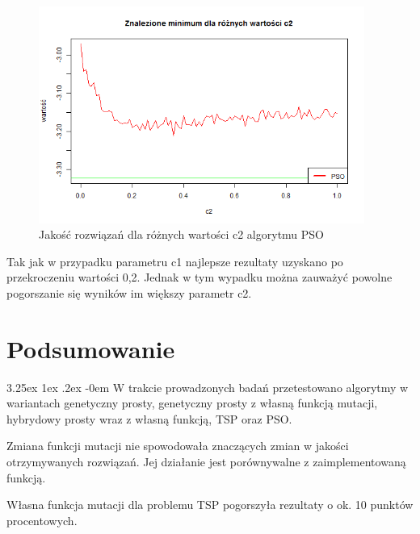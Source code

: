 \documentclass[11pt, a4paper]{article}
\makeatletter
\newcommand{\fbi}{\leavevmode{\parindent=1em\indent}}
\renewcommand\paragraph{\@startsection{paragraph}{5}{\z@}
  {3.25ex \@plus1ex \@minus.2ex}
  {-0em}
  {\normalfont\normalsize\bfseries}}
\makeatother
\begin{document}
\begin{figure}[H]
	\centering
	\includegraphics[width=0.95\textwidth]{./assets/Hartman6c2.png}
	\caption{Jakość rozwiązań dla różnych wartości c2 algorytmu PSO}
	\label{fig:psoc2}
\end{figure}

\fbi
Tak jak w przypadku parametru c1 najlepsze rezultaty uzyskano po przekroczeniu wartości 0,2. Jednak w tym wypadku można zauważyć powolne pogorszanie się wyników im większy parametr c2. 

\newpage
\section{Podsumowanie}
\paragraph{}
W trakcie prowadzonych badań przetestowano algorytmy w wariantach genetyczny prosty, genetyczny prosty z własną funkcją mutacji, hybrydowy prosty wraz z własną funkcją, TSP oraz PSO.

\fbi
Zmiana funkcji mutacji nie spowodowała znaczących zmian w jakości otrzymywanych rozwiązań. Jej działanie jest porównywalne z zaimplementowaną funkcją.

\fbi
Własna funkcja mutacji dla problemu TSP pogorszyła rezultaty o ok. 10 punktów procentowych.
\end{document}
